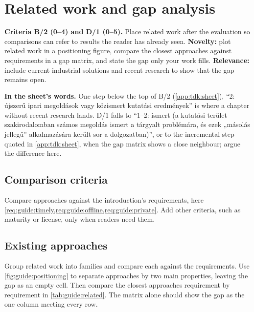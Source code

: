 \section{Related work and gap analysis}\label{app:chapters:related}
\textbf{Criteria B/2 (0--4) and D/1 (0--5).} Place related work after the evaluation so comparisons can refer to results the reader has already seen.
\textbf{Novelty:} plot related work in a positioning figure, compare the closest approaches against requirements in a gap matrix, and state the gap only your work fills.
\textbf{Relevance:} include current industrial solutions and recent research to show that the gap remains open.

\textbf{In the sheet's words.} One step below the top of B/2 (\cref{app:tdk:sheet}), \enquote{2: újszerű ipari megoldások vagy közismert kutatási eredmények} is where a chapter without recent research lands. D/1 falls to \enquote{1--2: ismert (a kutatási terület szakirodalomban számos megoldás ismert a tárgyalt problémára, és ezek „másolás jellegű” alkalmazására került sor a dolgozatban)}, or to the incremental step quoted in \cref{app:tdk:sheet}, when the gap matrix shows a close neighbour; argue the difference here.

\subsection{Comparison criteria}\label{app:chapters:comparison-criteria}
Compare approaches against the introduction's requirements, here \cref{req:guide:timely,req:guide:offline,req:guide:private}. Add other criteria, such as maturity or license, only when readers need them.

\subsection[Existing approaches]{Existing approaches\skimmark}\label{app:chapters:existing-approaches}
Group related work into families and compare each against the requirements. Use \cref{fig:guide:positioning} to separate approaches by two main properties, leaving the gap as an empty cell. Then compare the closest approaches requirement by requirement in \cref{tab:guide:related}. The matrix alone should show the gap as the one column meeting every row.

